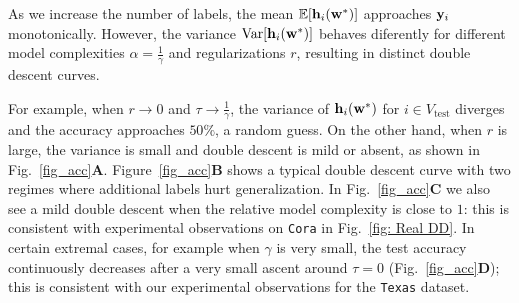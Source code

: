 \documentclass[9pt,twocolumn]{pnas-new}
\begin{document}
As we increase the number of labels, the mean $\mathbb{E}[\mathbf{h}_i(\mathbf{w}^*)]$ approaches $\mathbf{y}_i$ monotonically. However, the variance $\mathrm{Var}[ \mathbf{h}_i(\mathbf{w}^*)]$ behaves diferently for different model complexities $\alpha = \frac{1}{\gamma}$ and regularizations $r$, resulting in distinct double descent curves.

For example, when $r \to 0$ and $\tau \to \frac{1}{\gamma}$, the variance of $\mathbf{h}_{i}(\mathbf{w}^*)$ for $i \in V_{\text{test}}$ diverges and the accuracy approaches $50\%$, a random guess. On the other hand, when $r$ is large, the variance is small and double descent is mild or absent, as shown in Fig.~\ref{fig_acc}\textbf{\textsf{A}}. Figure~\ref{fig_acc}\textbf{\textsf{B}} shows a typical double descent curve with two regimes where additional labels hurt generalization. In Fig.~\ref{fig_acc}\textbf{\textsf{C}} we also see a mild double descent when the relative model complexity is close to $1$: this is consistent with experimental observations on \texttt{Cora} in Fig.~\ref{fig: Real DD}. In certain extremal cases, for example when $\gamma$ is very small, the test accuracy continuously decreases after a very small ascent around $\tau=0$ (Fig.~\ref{fig_acc}\textbf{\textsf{D}}); this is consistent with our experimental observations for the \texttt{Texas} dataset.





\end{document}
